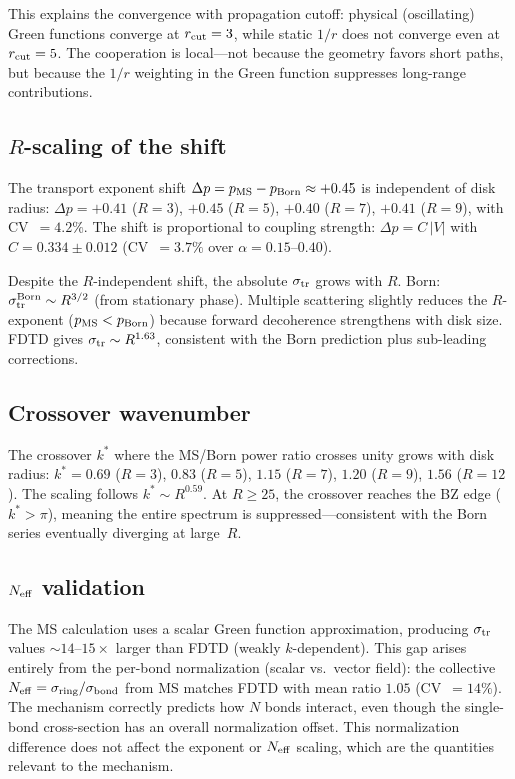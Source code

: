 \documentclass[11pt]{article}
\begin{document}
This explains the convergence with propagation cutoff: physical (oscillating)
Green functions converge at $r_{\rm cut} = 3$, while static $1/r$ does not
converge even at $r_{\rm cut} = 5$. The cooperation is local---not because
the geometry favors short paths, but because the $1/r$ weighting in the Green
function suppresses long-range contributions.

\subsection{$R$-scaling of the shift}

The transport exponent shift $\Delta p = p_{\rm MS} - p_{\rm Born} \approx
+0.45$ is independent of disk radius: $\Delta p = +0.41$ ($R = 3$), $+0.45$
($R = 5$), $+0.40$ ($R = 7$), $+0.41$ ($R = 9$), with CV~$= 4.2\%$. The shift
is proportional to coupling strength: $\Delta p = C\,|V|$ with
$C = 0.334 \pm 0.012$ (CV~$= 3.7\%$ over $\alpha = 0.15$--$0.40$).

Despite the $R$-independent shift, the absolute $\sigma_{\rm tr}$ grows with
$R$. Born: $\sigma_{\rm tr}^{\rm Born} \sim R^{3/2}$ (from stationary phase).
Multiple scattering slightly reduces the $R$-exponent ($p_{\rm MS} < p_{\rm
Born}$) because forward decoherence strengthens with disk size. FDTD gives
$\sigma_{\rm tr} \sim R^{1.63}$, consistent with the Born prediction plus
sub-leading corrections.

\subsection{Crossover wavenumber}

The crossover $k^*$ where the MS/Born power ratio crosses unity grows with
disk radius: $k^* = 0.69$ ($R = 3$), $0.83$ ($R = 5$), $1.15$ ($R = 7$),
$1.20$ ($R = 9$), $1.56$ ($R = 12$). The scaling follows $k^* \sim R^{0.59}$.
At $R \geq 25$, the crossover reaches the BZ edge ($k^* > \pi$), meaning the
entire spectrum is suppressed---consistent with the Born series eventually
diverging at large~$R$.

\subsection{$N_{\rm eff}$ validation}

The MS calculation uses a scalar Green function approximation, producing
$\sigma_{\rm tr}$ values $\sim\!14$--$15\times$ larger than FDTD (weakly
$k$-dependent). This gap arises entirely from the per-bond normalization
(scalar vs.\ vector field): the
collective $N_{\rm eff} = \sigma_{\rm ring}/\sigma_{\rm bond}$ from MS matches
FDTD with mean ratio $1.05$ (CV~$= 14\%$). The mechanism correctly predicts
how $N$ bonds interact, even though the single-bond cross-section has an overall
normalization offset. This normalization difference does not affect the exponent
or $N_{\rm eff}$ scaling, which are the quantities relevant to the mechanism.
\end{document}
